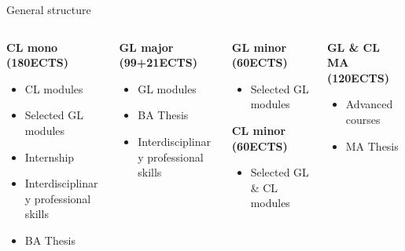 \documentclass[aspectratio=169,hyperref={unicode},xcolor={dvipsnames}]{beamer}
\begin{document}
\begin{frame}{General structure}
\begin{columns}[T]
	\begin{column}{0.25\linewidth}
		\textbf{CL mono (180ECTS)}
		\begin{itemize}
			\item CL modules
			\item Selected GL modules
			\item Internship
			\item Interdisciplinary professional skills
			\item BA Thesis
		\end{itemize}
	\end{column}
	\begin{column}{0.25\linewidth}
		\textbf{GL major (99+21ECTS)}
		\begin{itemize}
			\item GL modules
			\item BA Thesis
			\item Interdisciplinary professional skills
		\end{itemize}
	\end{column}
	 \begin{column}{0.25\linewidth}
	 \textbf{GL minor (60ECTS)}
	 	\begin{itemize}
	 		\item Selected GL modules
	 	\end{itemize}
	 \textbf{CL minor (60ECTS)}
	 	 \begin{itemize}
	 		\item Selected GL \& CL modules
	 	\end{itemize}
   	\end{column}
	\begin{column}{0.25\linewidth}
		\textbf{GL \& CL MA (120ECTS)}
		\begin{itemize}
			\item Advanced courses
			\item MA Thesis
		\end{itemize}
	\end{column}
\end{columns}
\end{frame}
\end{document}
